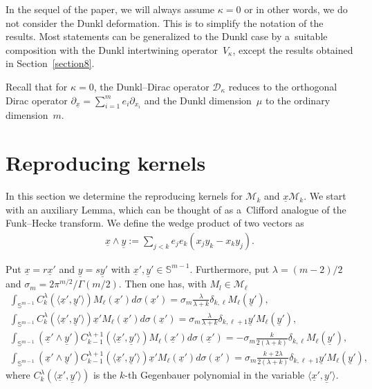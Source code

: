\documentclass[pdftex]{sigma}
\numberwithin{equation}{section}
\numberwithin{theorem}{section}
\numberwithin{proposition}{section}
\numberwithin{lemma}{section}
\numberwithin{corollary}{section}
\numberwithin{definition}{section}
\numberwithin{example}{section}
\numberwithin{remark}{section}
\numberwithin{note}{section}
\theoremstyle{remark}
\newcommand{\mS}{\mathbb{S}}
\newcommand{\cD}{\mathcal{D}}
\newcommand{\cM}{\mathcal{M}}
\newcommand{\ux}{\underline{x}}
\newcommand{\uy}{\underline{y}}
\newcommand{\upx}{\partial_{\underline{x}}}
\def\k{{\kappa}}
\def\l{{\lambda}}
\def\s{{\sigma}}
\def\la{{\langle}}
\def\ra{{\rangle}}
\begin{document}
In the sequel of the paper, we will always assume $\kappa=0$ or in other words, we do not consider
the Dunkl deformation.
This is to simplify the notation of the results.
Most statements can be generalized to the Dunkl case by a~suitable composition with the Dunkl
intertwining operator~$V_{\k}$, except the results obtained in Section~\ref{section8}.

Recall that for $\kappa=0$, the Dunkl--Dirac operator $\cD_{\k}$ reduces to the orthogonal Dirac
operator $\upx=\sum\limits_{i=1}^{m}e_{i}\partial_{x_{i}}$ and the Dunkl dimension~$\mu$ to the ordinary
dimension~$m$.

\section{Reproducing kernels}\label{section5}

In this section we determine the reproducing kernels for $\cM_{k}$ and $\ux\cM_{k}$.
We start with an auxiliary Lemma, which can be thought of as a~Clif\/ford analogue
of the Funk--Hecke transform.
We def\/ine the wedge product of two vectors as
\begin{gather*}
\ux\wedge\uy:=\sum_{j<k}e_{j}e_{k}(x_{j}y_{k}-x_{k}y_{j}).
\end{gather*}

\begin{lemma}
\label{auxintegrals}
Put $\ux=r\ux'$ and $\uy=s\uy'$ with $\ux',\uy'\in\mS^{m-1}$.
Furthermore, put $\lambda=(m-2)/2$ and $\sigma_m=2\pi^{m/2}/\Gamma(m/2)$.
Then one has, with $M_{l}\in\cM_{\ell}$
\begin{gather*}
\int_{\mS^{m-1}} C_{k}^{\lambda}(\la\ux', \uy' \ra) M_{\ell}(\ux')d \s (\ux') = \sigma_m
\frac{\l}{\l+k} \delta_{k, \ell} M_{\ell}(\uy'),\\
\int_{\mS^{m-1}} C_{k}^{\lambda}(\la\ux', \uy' \ra) \ux' M_{\ell}(\ux')d \s (\ux') = \sigma_m
\frac{\l}{\l+k} \delta_{k, \ell+1} \uy' M_{\ell}(\uy'),\\
\int_{\mS^{m-1}} (\ux' \wedge \uy' ) C_{k-1}^{\lambda+1}(\la\ux', \uy' \ra) M_{\ell}(\ux')d \s
(\ux') = - \sigma_m \frac{k}{2(\l+k)} \delta_{k, \ell} M_{\ell}(\uy'),\\
\int_{\mS^{m-1}} (\ux' \wedge \uy' ) C_{k-1}^{\lambda+1}(\la\ux', \uy' \ra) \ux' M_{\ell}(\ux')d
\s (\ux') = \sigma_m \frac{k+2\l}{2(\l+k)} \delta_{k, \ell+1} \uy' M_{\ell}(\uy'),
\end{gather*}
where $C_{k}^{\lambda}(\la\ux',\uy'\ra)$ is the $k$-th Gegenbauer polynomial in the variable
$\la\ux',\uy'\ra$.
\end{lemma}
\end{document}

